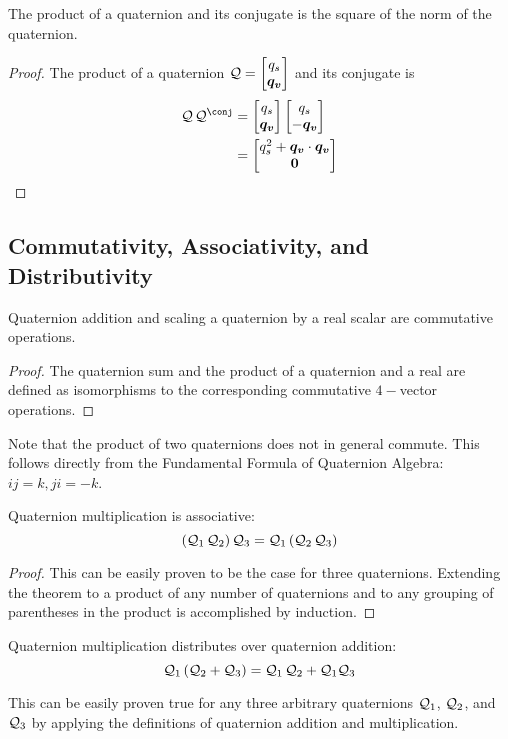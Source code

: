 \begin{corollary}\label{thm:quat_quat_conj_prod}
The product of a quaternion and its conjugate is the square of
the norm of the quaternion.
\end{corollary}

\begin{proof}
The product of a quaternion $\quat Q = \quatsv {q_s}{\vect{q_v}}$
and its conjugate is
\begin{align*}
  \QxQ{\quat Q}{\quatconj Q} &=
  \QxQ{\quatsv {q_s}{\vect{q_v}}}{\quatsv {q_s}{- \vect{q_v}}}  \\
  &= \quatsv {q_s^2 + \vect{q_v} \cdot \vect{q_v}}{\vect 0}
\end{align*}
\end{proof}


\subsection{Commutativity, Associativity, and Distributivity}

\begin{theorem}\label{thm:quat_sum_and_scale_commute}
Quaternion addition and scaling a quaternion by a real scalar
are commutative operations.
\end{theorem}
\begin{proof}
The quaternion sum and the product of a quaternion and a real are defined as
isomorphisms to the corresponding commutative $4-$vector operations.
\end{proof}

Note that the product of two quaternions does not in general commute.
This follows directly from the Fundamental Formula of Quaternion Algebra:
$ij = k, ji = -k$.

\begin{theorem}\label{thm:quat_prod_assoc}
Quaternion multiplication is associative:
\begin{equation*}
  \QxQ{(\QxQ{\quat{Q}_1}{\quat{Q}_2})}{\quat{Q}_3} =
    \QxQ{\quat{Q}_1}{(\QxQ{\quat{Q}_2}{\quat{Q}_3})}
\end{equation*}
\end{theorem}
\begin{proof}
This can be easily proven to be the case for three quaternions.
Extending the theorem to a product of any number of quaternions and to any
grouping of parentheses in the product is accomplished by induction.
\end{proof}

\begin{theorem}\label{thm:quat_prod_distrib}
Quaternion multiplication distributes over quaternion addition:
\begin{equation}
  \QxQ{\quat Q _1}{\left({\quat Q _2 + \quat Q _3}\right)} =
    \QxQ{\quat Q _1}{\quat Q _2} + {\quat Q _1}{\quat Q _3}
\end{equation}
\end{theorem}
This can be easily proven true for any three arbitrary quaternions
$\mathcal{Q} _1$, $\mathcal{Q} _2$, and $\mathcal{Q} _3$ by applying the
definitions of quaternion addition and multiplication.

